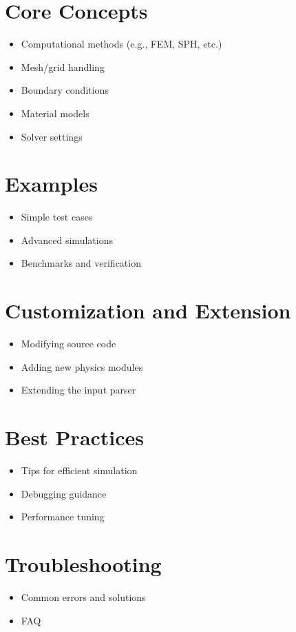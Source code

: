 \documentclass[12pt]{article}
\begin{document}
	\section{Core Concepts}
	\begin{itemize}
		\item Computational methods (e.g., FEM, SPH, etc.)
		\item Mesh/grid handling
		\item Boundary conditions
		\item Material models
		\item Solver settings
	\end{itemize}
	
	\section{Examples}
	\begin{itemize}
		\item Simple test cases
		\item Advanced simulations
		\item Benchmarks and verification
	\end{itemize}
	
	\section{Customization and Extension}
	\begin{itemize}
		\item Modifying source code
		\item Adding new physics modules
		\item Extending the input parser
	\end{itemize}
	
	\section{Best Practices}
	\begin{itemize}
		\item Tips for efficient simulation
		\item Debugging guidance
		\item Performance tuning
	\end{itemize}
	
	\section{Troubleshooting}
	\begin{itemize}
		\item Common errors and solutions
		\item FAQ
	\end{itemize}
	
\end{document}
